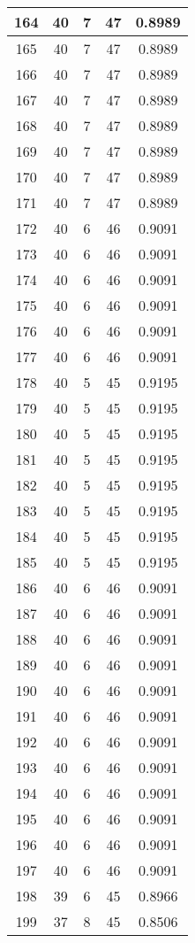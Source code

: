 \documentclass[letterpaper, 12pt]{article}
\begin{document}
\begin{longtable}{|c|c|c|c|c|}
\hline
164 & 40 & 7 & 47 & 0.8989 \\
\hline
165 & 40 & 7 & 47 & 0.8989 \\
\hline
166 & 40 & 7 & 47 & 0.8989 \\
\hline
167 & 40 & 7 & 47 & 0.8989 \\
\hline
168 & 40 & 7 & 47 & 0.8989 \\
\hline
169 & 40 & 7 & 47 & 0.8989 \\
\hline
170 & 40 & 7 & 47 & 0.8989 \\
\hline
171 & 40 & 7 & 47 & 0.8989 \\
\hline
172 & 40 & 6 & 46 & 0.9091 \\
\hline
173 & 40 & 6 & 46 & 0.9091 \\
\hline
174 & 40 & 6 & 46 & 0.9091 \\
\hline
175 & 40 & 6 & 46 & 0.9091 \\
\hline
176 & 40 & 6 & 46 & 0.9091 \\
\hline
177 & 40 & 6 & 46 & 0.9091 \\
\hline
178 & 40 & 5 & 45 & 0.9195 \\
\hline
179 & 40 & 5 & 45 & 0.9195 \\
\hline
180 & 40 & 5 & 45 & 0.9195 \\
\hline
181 & 40 & 5 & 45 & 0.9195 \\
\hline
182 & 40 & 5 & 45 & 0.9195 \\
\hline
183 & 40 & 5 & 45 & 0.9195 \\
\hline
184 & 40 & 5 & 45 & 0.9195 \\
\hline
185 & 40 & 5 & 45 & 0.9195 \\
\hline
186 & 40 & 6 & 46 & 0.9091 \\
\hline
187 & 40 & 6 & 46 & 0.9091 \\
\hline
188 & 40 & 6 & 46 & 0.9091 \\
\hline
189 & 40 & 6 & 46 & 0.9091 \\
\hline
190 & 40 & 6 & 46 & 0.9091 \\
\hline
191 & 40 & 6 & 46 & 0.9091 \\
\hline
192 & 40 & 6 & 46 & 0.9091 \\
\hline
193 & 40 & 6 & 46 & 0.9091 \\
\hline
194 & 40 & 6 & 46 & 0.9091 \\
\hline
195 & 40 & 6 & 46 & 0.9091 \\
\hline
196 & 40 & 6 & 46 & 0.9091 \\
\hline
197 & 40 & 6 & 46 & 0.9091 \\
\hline
198 & 39 & 6 & 45 & 0.8966 \\
\hline
199 & 37 & 8 & 45 & 0.8506 \\
\hline
\end{longtable}
\end{document}
